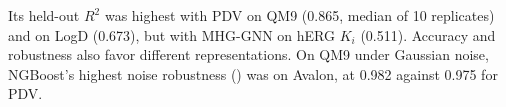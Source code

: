 Its held-out $R^2$ was highest with PDV on QM9 (0.865, median of 10 replicates) and on LogD (0.673), but with MHG-GNN on hERG $K_i$ (0.511). Accuracy and robustness also favor different representations. On QM9 under Gaussian noise, NGBoost's highest noise robustness (\aucnorm) was on Avalon, at 0.982 against 0.975 for PDV.

